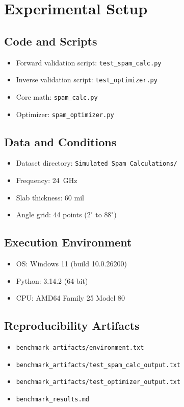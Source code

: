 \documentclass[11pt]{article}
\begin{document}
\section{Experimental Setup}

\subsection{Code and Scripts}
\begin{itemize}
    \item Forward validation script: \texttt{test\_spam\_calc.py}
    \item Inverse validation script: \texttt{test\_optimizer.py}
    \item Core math: \texttt{spam\_calc.py}
    \item Optimizer: \texttt{spam\_optimizer.py}
\end{itemize}

\subsection{Data and Conditions}
\begin{itemize}
    \item Dataset directory: \texttt{Simulated Spam Calculations/}
    \item Frequency: \SI{24}{\giga\hertz}
    \item Slab thickness: 60 mil
    \item Angle grid: 44 points (\(2^\circ\) to \(88^\circ\))
\end{itemize}

\subsection{Execution Environment}
\begin{itemize}
    \item OS: Windows 11 (build 10.0.26200)
    \item Python: 3.14.2 (64-bit)
    \item CPU: AMD64 Family 25 Model 80
\end{itemize}

\subsection{Reproducibility Artifacts}
\begin{itemize}
    \item \texttt{benchmark\_artifacts/environment.txt}
    \item \texttt{benchmark\_artifacts/test\_spam\_calc\_output.txt}
    \item \texttt{benchmark\_artifacts/test\_optimizer\_output.txt}
    \item \texttt{benchmark\_results.md}
\end{itemize}
\end{document}
